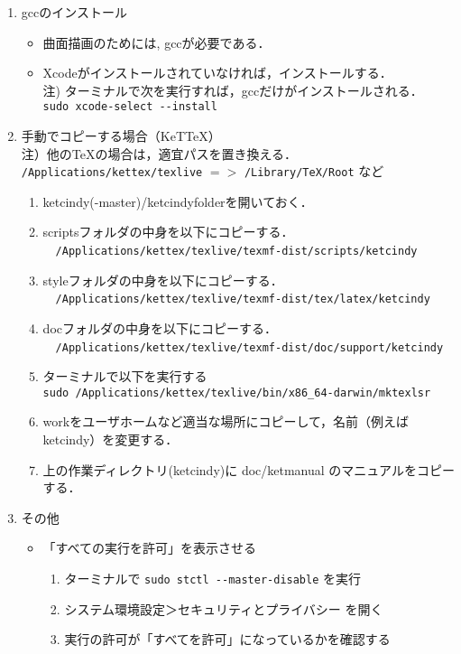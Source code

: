 \documentclass{ujarticle}
\begin{document}
\begin{enumerate}[\bf\large 1.]
\item gccのインストール
  \begin{itemize}
    \item 曲面描画のためには, gccが必要である．
    \item Xcodeがインストールされていなければ，インストールする．\\
    \hspace*{5mm}注) ターミナルで次を実行すれば，gccだけがインストールされる．\\
    \hspace*{20mm}\verb|sudo xcode-select --install|
  \end{itemize}

\item 手動でコピーする場合（KeTTeX）\\
\hspace*{1zw}注）他のTeXの場合は，適宜パスを置き換える．\\
\hspace*{3zw}\verb|/Applications/kettex/texlive| $=>$ \verb|/Library/TeX/Root| など
  \begin{enumerate}[(1)]
  \item ketcindy(-master)/ketcindyfolderを開いておく．
  \item scriptsフォルダの中身を以下にコピーする．\\
　\verb|/Applications/kettex/texlive/texmf-dist/scripts/ketcindy|
  \item styleフォルダの中身を以下にコピーする．\\
　\verb|/Applications/kettex/texlive/texmf-dist/tex/latex/ketcindy|
  \item docフォルダの中身を以下にコピーする．\\
　\verb|/Applications/kettex/texlive/texmf-dist/doc/support/ketcindy|
  \item ターミナルで以下を実行する\\
  \hspace*{1zw}\verb|sudo /Applications/kettex/texlive/bin/x86_64-darwin/mktexlsr|
  \item workをユーザホームなど適当な場所にコピーして，名前（例えばketcindy）を変更する．
  \item 上の作業ディレクトリ(ketcindy)に doc/ketmanual のマニュアルをコピーする．
  \end{enumerate}

\item その他

\begin{itemize}
 \item 「すべての実行を許可」を表示させる
\begin{enumerate}[(1)]
\item ターミナルで \verb|sudo stctl --master-disable| を実行
\item システム環境設定＞セキュリティとプライバシー を開く
\item 実行の許可が「すべてを許可」になっているかを確認する
   \end{enumerate}


\end{itemize}
\end{enumerate}
\end{document}
